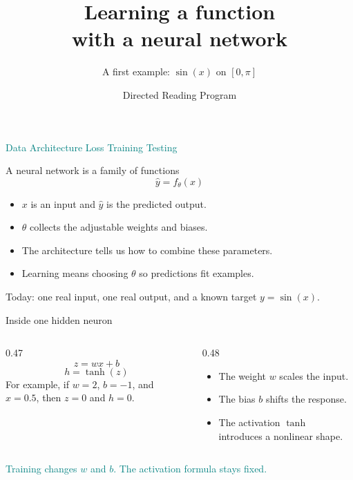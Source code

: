\documentclass[aspectratio=169,11pt]{beamer}
\title{Learning a function\\with a neural network}
\subtitle{A first example: \texorpdfstring{$\sin(x)$ on $[0,\pi]$}{sin(x) on [0, pi]}}
\author{Directed Reading Program}
\date{}
\begin{document}
\begin{frame}
\titlepage
\vspace{-5mm}
\centering\textcolor{Teal}{Data \quad Architecture \quad Loss \quad Training \quad Testing}
\end{frame}

\begin{frame}{A neural network is a family of functions}
\large
\[\boxed{\widehat y=f_\theta(x)}\]
\begin{itemize}\setlength\itemsep{4mm}
\item $x$ is an input and $\widehat y$ is the predicted output.
\item $\theta$ collects the adjustable \alert{weights and biases}.
\item The architecture tells us how to combine these parameters.
\item Learning means choosing $\theta$ so predictions fit examples.
\end{itemize}
\vspace{3mm}
Today: one real input, one real output, and a known target $y=\sin(x)$.
\end{frame}

\begin{frame}{Inside one hidden neuron}
\begin{columns}[c]
\begin{column}{0.47\textwidth}
\Large
\[z=wx+b\]
\[h=\tanh(z)\]
\normalsize
For example, if $w=2$, $b=-1$, and $x=0.5$, then $z=0$ and $h=0$.
\end{column}
\begin{column}{0.48\textwidth}
\begin{itemize}\setlength\itemsep{4mm}
\item The weight $w$ scales the input.
\item The bias $b$ shifts the response.
\item The activation $\tanh$ introduces a nonlinear shape.
\end{itemize}
\end{column}
\end{columns}
\vspace{7mm}
\textcolor{Teal}{Training changes $w$ and $b$. The activation formula stays fixed.}
\end{frame}
\end{document}
